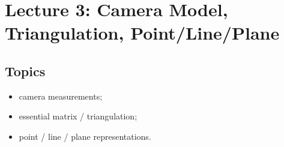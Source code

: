 \section{Lecture 3: Camera Model, Triangulation, Point/Line/Plane}
\label{sec:lecture03}

\subsection{Topics}
\begin{itemize}[itemsep=0.3em]
\item camera measurements;
\item essential matrix / triangulation;
\item point / line / plane representations.
\end{itemize}

\setlength{\arraycolsep}{3.5pt}

\newcommand{\camprojscene}{%
  \draw[->,thick] (0,0) -- (0.9,0) node[right] {$x$};
  \draw[->,thick] (0,0) -- (0,-0.9) node[below] {$y$};
  \node[above left=-2pt] at (0,0) {$\{C\}$};
  \fill (0,0) circle (1.5pt);
  \coordinate (lc3zc) at (1.515,0.90);   %
  \draw[thin,gray!70] (0,0) -- (lc3zc);
  \draw[dashed] (lc3zc) -- (5.05,3.00);
  \draw[blue,thick] (0.766,1.505) -- (1.426,1.705) -- (2.264,0.295) -- (1.604,0.095) -- cycle;
  \fill[blue] (lc3zc) circle (1.3pt);
  \node[blue,right=1pt] at (1.66,0.99) {$\vect{z}_c$};
  \node[left] at (0.55,1.78) {\footnotesize Image plane};
  \fill (5.05,3.00) circle (1.6pt);
  \node[above right] at (5.05,3.00) {$\vect{P}_f$};
  \node[above left] at (3.55,2.45) {${}^{C}\vect{p}_f$};
  \draw[->,thick] (6.20,0) -- (6.20,1.10) node[above] {$z$};
  \draw[->,thick] (6.20,0) -- (7.12,0.16) node[right] {$y$};
  \node at (5.88,-0.14) {$\boldsymbol{\times}$};
  \node[below] at (5.88,-0.22) {$x$};
  \node[above right=0pt] at (6.30,0.10) {$\{G\}$};
  \fill (6.20,0) circle (1.5pt);
  \draw[dotted,thick] (6.20,0) -- (5.05,3.00);
  \node[right] at (5.55,1.70) {${}^{G}\vect{p}_f$};
  \draw[red,thick] (0,0) to[bend right=12] (6.20,0);
}

